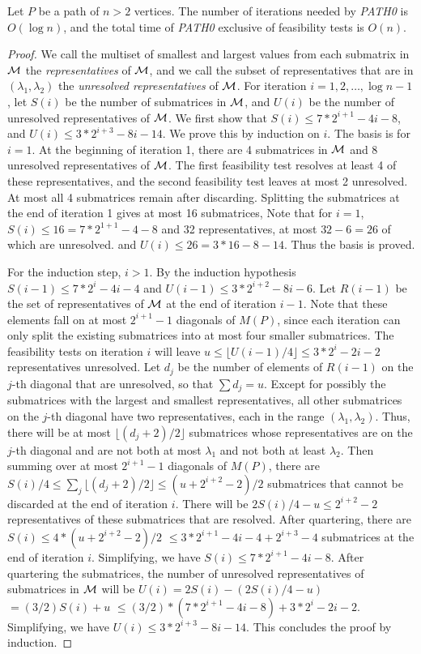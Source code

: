 \begin{lemma}
\label{lem:2:1}
Let $P$ be a path of $n>2$ vertices.
The number of iterations needed by {\it PATH0} is $O(\log n)$,
and the total time of {\it PATH0} exclusive of feasibility tests is $O(n)$.
\end{lemma}
\begin{proof}
We call the multiset of smallest and largest values from each submatrix in $\cal M$ the {\it representatives} of $\cal M$,
and we call the subset of representatives that are in $(\lambda_1,\lambda_2)$ the {\it unresolved representatives} of $\cal M$.
For iteration $i = 1, 2, \ldots , \log n -1$,
let $S(i)$ be the number of submatrices in $\cal M$,
and $U(i)$ be the number of unresolved representatives of $\cal M$.
We first show that $S(i) \leq 7*2^{i+1}-4i-8$,
and $U(i) \leq 3*2^{i+3}-8i-14$.
We prove this by induction on $i$.
The basis is for $i=1$.
At the beginning of iteration 1,
there are 4 submatrices in $\cal M$ and 8 unresolved representatives of $\cal M$.
The first feasibility test resolves at least 4 of these representatives,
and the second feasibility test leaves at most 2 unresolved.
At most all 4 submatrices remain after discarding.
Splitting the submatrices at the end of iteration 1 gives at most 16 submatrices,
Note that for $i=1$, $S(i) \leq 16 = 7*2^{1+1}-4-8$ 
and 32 representatives, at most $32-6=26$ of which are unresolved.
and $U(i) \leq 26 = 3*16-8-14$.
Thus the basis is proved.

For the induction step, $i>1$.
By the induction hypothesis $S(i-1) \leq 7*2^i-4i-4$ and $U(i-1) \leq 3*2^{i+2}-8i-6$.
Let $R(i-1)$ be the set of representatives of $\cal M$ at the end of iteration $i-1$.
Note that these elements fall on at most $2^{i+1}-1$ diagonals of $M(P)$, since each iteration can only split the existing submatrices into at most four smaller submatrices. 
The feasibility tests on iteration $i$ will leave $u \leq \lfloor U(i-1)/4 \rfloor \leq 3*2^i-2i-2$ representatives unresolved.
Let $d_j$ be the number of elements of $R(i-1)$ on the $j$-th diagonal that are unresolved, so that $\sum d_j=u$. 
Except for possibly the submatrices with the largest and smallest representatives, all other submatrices on the $j$-th diagonal have two representatives, each in the range $(\lambda_1,\lambda_2)$. 
Thus, there will be at most $\lfloor (d_j +2)/2 \rfloor$ submatrices
whose representatives are on the $j$-th diagonal and are not
both at most $\lambda_1$ and not both at least $\lambda_2$.
Then summing over at most $2^{i+1}-1$ diagonals of $M(P)$, 
there are $S(i)/4 \leq \sum_j\lfloor{(d_j+2)/2\rfloor}\le(u + 2^{i+2}-2)/2$ submatrices
that cannot be discarded at the end of iteration $i$.
There will be $2S(i)/4 - u \leq 2^{i+2}-2$ representatives
of these submatrices that are resolved.
After quartering, there are $S(i) \leq 4*(u + 2^{i+2}-2)/2$
$\leq 3*2^{i+1}-4i-4 + 2^{i+3} -4$ submatrices
at the end of iteration $i$.
Simplifying, we have $S(i) \leq 7*2^{i+1}-4i-8$.
After quartering the submatrices,
the number of unresolved representatives of submatrices in $\cal M$ will be
$U(i) = 2S(i)-(2S(i)/4 - u)$
$= (3/2)S(i) + u$
$\leq (3/2)*(7*2^{i+1}-4i-8) + 3*2^i-2i-2$.
Simplifying,
we have $U(i) \leq 3*2^{i+3}-8i-14$.
This concludes the proof by induction.


\end{proof}
